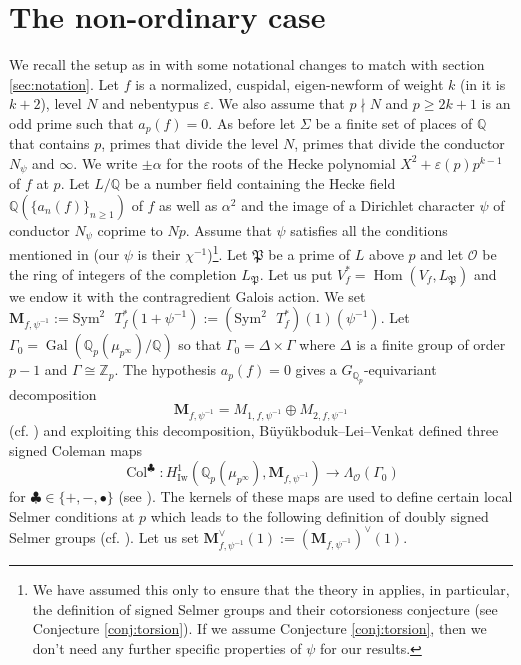 \documentclass{amsart}
\renewcommand{\geq}{\geqslant}
\newcommand{\HIw}{H^1_{\mathrm{Iw}}}
\newcommand{\Q}{\mathbb{Q}}
\newcommand{\Z}{\mathbb{Z}}
\newcommand{\bM}{\mathbf{M}}
\newcommand{\Gal}{\operatorname{Gal}}
\newcommand{\Hom}{\operatorname{Hom}}
\newcommand{\col}{\operatorname{Col}}
\renewcommand{\O}{\mathcal{O}}
\newtheorem{auxiliary proposition}[theorem]{Auxiliary Proposition}
\newtheorem{main conjecture}[theorem]{Main Conjecture}
\newtheorem{main theorem}[theorem]{Main Theorem}
\newtheorem{modesty proposition}[theorem]{Modesty Proposition}
\newtheorem{open problem}[theorem]{Open Problem}
\newtheorem{convergence lemma}[theorem]{Convergence Lemma}
\newtheorem{corrected lemma}[theorem]{Corrected Lemma}
\newtheorem{growth lemma}[theorem]{Growth Lemma}
\newtheorem{coefficient lemma}[theorem]{Integrality Lemma}
\newtheorem{interpolation lemma}[theorem]{Interpolation Lemma}
\newtheorem{kernel lemma}[theorem]{Kernel Lemma}
\newtheorem{limit lemma}[theorem]{Limit Lemma}
\newtheorem{tandem lemma}[theorem]{Modesty Lemma}
\newtheorem{zero-finding lemma}[theorem]{Zero-Finding Lemma}
\begin{document}
\section{The non-ordinary case}
We recall the setup as in \cite{BLV} with some notational changes to match with section \ref{sec:notation}. Let $f$ is a normalized, cuspidal, eigen-newform of weight $k$ (in \cite{BLV} it is $k+2$), level $N$ and nebentypus $\varepsilon$. We also assume that $p \nmid N$ and $p\geq 2k+1$ is an odd prime such that $a_p(f)=0$. As before let $\Sigma$ be  a finite set of places of $\Q$ that contains $p$, primes that divide the level $N$, primes that divide the conductor $N_\psi$ and  $\infty$. We write $\pm\alpha$ for the roots of the Hecke polynomial $X^2+ \varepsilon(p)p^{k-1}$ of $f$ at $p$. Let $L/\Q$ be a number field containing the Hecke field $\Q(\{a_n(f)\}_{n \geq 1})$ of $f$ as well as $\alpha^2$ and the image of a Dirichlet character $\psi$ of conductor $N_\psi$ coprime to $Np$. Assume that  $\psi$ satisfies all the conditions mentioned in \cite[page 3]{BLV} (our $\psi$ is their $\chi^{-1}$)\footnote{We have assumed this only to ensure that the theory in \cite{BLV} applies, in particular, the definition of signed Selmer groups and their cotorsioness conjecture (see Conjecture \ref{conj:torsion}). If we assume Conjecture \ref{conj:torsion}, then we don't need any further specific properties of $\psi$ for our results.}. Let $\mathfrak{P}$ be a prime of $L$ above $p$ and let $\O$ be the ring of integers of the completion $L_{\mathfrak{P}}$. Let us put $V_f^*=\Hom(V_f, L_{\mathfrak{P}})$ and we endow it with the contragredient Galois action. We set $\bM_{f, \psi^{-1}}:=\mathrm{Sym}^2 \text{ }T_f^*(1+\psi^{-1}):=(\mathrm{Sym}^2 \text{ }T_f^*)(1)(\psi^{-1})$. Let $\Gamma_0=\Gal(\Q_p(\mu_{p^\infty})/\Q)$ so that $ \Gamma_0 = \Delta \times \Gamma$ where $\Delta$ is a finite group of order $p-1$ and $\Gamma \cong \Z_p$. The hypothesis $a_p(f)=0$ gives a $G_{\Q_p}$-equivariant decomposition
$$\bM_{f, \psi^{-1}}=M_{1,f, \psi^{-1}} \oplus M_{2,f, \psi^{-1}}$$
(cf. \cite[page 5 and page 25]{BLV}) and exploiting this decomposition, Büyükboduk--Lei--Venkat defined three signed Coleman maps $$\col^\clubsuit:\HIw(\Q_p(\mu_{p^\infty}),\bM_{f, \psi^{-1}}) \rightarrow \Lambda_{\O}(\Gamma_0)$$
for $\clubsuit \in \{+,-,\bullet\}$ (see \cite[Section 4.2]{BLV}). 
The kernels of these maps are used to define certain local Selmer conditions at $p$ which leads to the following definition of doubly signed Selmer groups (cf. \cite[Defn. 4.4.1]{BLV}).
Let us set $\bM_{f, \psi^{-1}}^\vee(1):=(\bM_{f, \psi^{-1}})^\vee(1)$.
\end{document}
